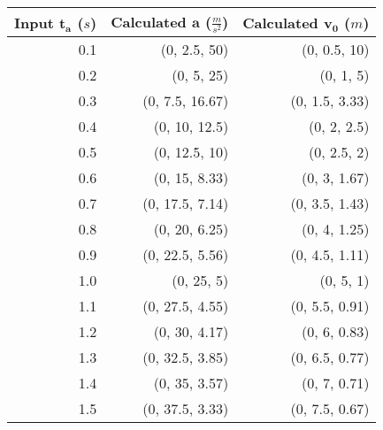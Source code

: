 \begin{tabular}{| r | r | r |}
	\hline
	\multicolumn{1}{|c|}{Input $\mathbf{t_a}$ ($s$)} & \multicolumn{1}{|c|}{Calculated $\mathbf{a}$ ($\frac{m}{s^2}$)} & \multicolumn{1}{|c|}{Calculated $\mathbf{v_{0}}$ ($m$)} \\ \hline
	0.1 & (0, 2.5,  50)    & (0, 0.5, 10)   \\ \hline
	0.2 & (0, 5,    25)    & (0, 1,   5)    \\ \hline
	0.3 & (0, 7.5,  16.67) & (0, 1.5, 3.33) \\ \hline
	0.4 & (0, 10,   12.5)  & (0, 2,   2.5)  \\ \hline
	0.5 & (0, 12.5, 10)    & (0, 2.5, 2)    \\ \hline
	0.6 & (0, 15,   8.33)  & (0, 3,   1.67) \\ \hline
	0.7 & (0, 17.5, 7.14)  & (0, 3.5, 1.43) \\ \hline
	0.8 & (0, 20,   6.25)  & (0, 4,   1.25) \\ \hline
	0.9 & (0, 22.5, 5.56)  & (0, 4.5, 1.11) \\ \hline
	1.0 & (0, 25,   5)     & (0, 5,   1)    \\ \hline
	1.1 & (0, 27.5, 4.55)  & (0, 5.5, 0.91) \\ \hline
	1.2 & (0, 30,   4.17)  & (0, 6,   0.83) \\ \hline
	1.3 & (0, 32.5, 3.85)  & (0, 6.5, 0.77) \\ \hline
	1.4 & (0, 35,   3.57)  & (0, 7,   0.71) \\ \hline
	1.5 & (0, 37.5, 3.33)  & (0, 7.5, 0.67) \\ \hline
\end{tabular}
